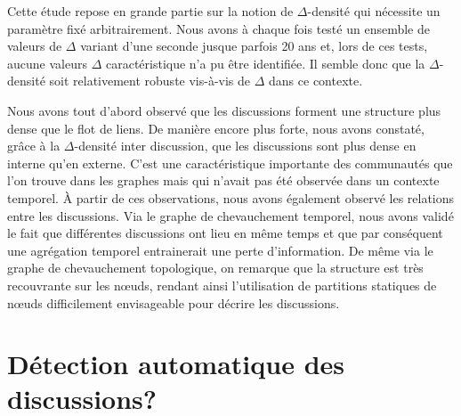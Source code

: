 Cette étude repose en grande partie sur la notion de $\Delta$-densité qui nécessite un paramètre fixé arbitrairement.
Nous avons à chaque fois testé un ensemble de valeurs de $\Delta$ variant d'une seconde jusque parfois 20 ans et, lors de ces tests, aucune valeurs $\Delta$ caractéristique n'a pu être identifiée.
Il semble donc que la $\Delta$-densité soit relativement robuste vis-à-vis de $\Delta$ dans ce contexte.

Nous avons tout d'abord observé que les discussions forment une structure plus dense que le flot de liens.
De manière encore plus forte, nous avons constaté, grâce à la  $\Delta$-densité inter discussion, que les discussions sont plus dense en interne qu'en externe.
C'est une caractéristique importante des communautés que l'on trouve dans les graphes mais qui n'avait pas été observée dans un contexte temporel.
\`A partir de ces observations, nous avons également observé les relations entre les discussions.
Via le graphe de chevauchement temporel, nous avons validé le fait que différentes discussions ont lieu en même temps et que par conséquent une agrégation temporel entrainerait une perte d'information.
De même via le graphe de chevauchement topologique, on remarque que la structure est très recouvrante sur les n\oe uds, rendant ainsi l'utilisation de partitions statiques de n\oe uds difficilement envisageable pour décrire les discussions.


\section{Détection automatique des discussions?}
